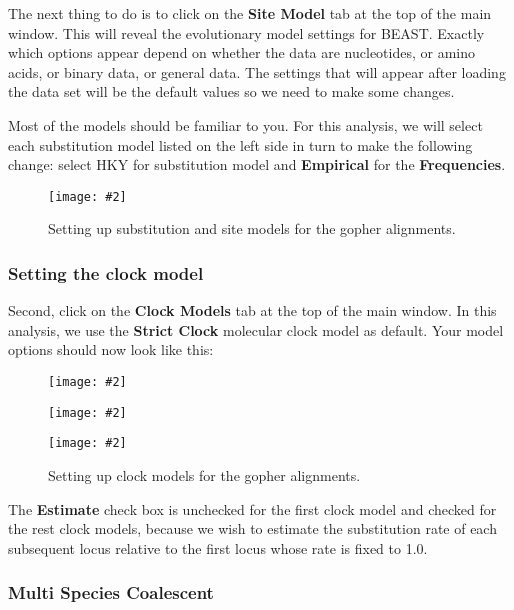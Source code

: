 \documentclass{article}
\newcommand{\includeimage}[2][]{%
\texttt{[image: \#2]}
}
\begin{document}
The next thing to do is to click on the {\bf Site Model} tab at the top of the
main window. This will reveal the evolutionary model settings for
BEAST. Exactly which options appear depend on whether the data are
nucleotides, or amino acids, or binary data, or general data.
The settings that will appear after loading the data set will
be the default values so we need to make some changes. 

Most of the models should be familiar to you. For this analysis, we
will select each substitution model listed on the 
left side in turn to make the following change: select HKY for substitution model
and \textbf{Empirical} for the \textbf{Frequencies}. 
\begin{figure}
\centering
\includeimage[width=\textwidth]{figures/BEAUti_Site_Model}

\caption{\label{fig.sitemodel} Setting up substitution and site models for the gopher alignments.}
\end{figure}


\subsubsection*{Setting the clock model}

Second, click on the {\bf Clock Models} tab at the top of the
main window. In this analysis, we use the \textbf{Strict Clock} molecular clock model as default.
Your model options should now look like this: 

\begin{figure}
\centering
\includeimage[scale=0.3,clip=true,trim=0 450 0 0]{figures/BEAUti_ClockModel1}

\centering
\includeimage[scale=0.3,clip=true,trim=0 450 0 0]{figures/BEAUti_ClockModel2}

\centering
\includeimage[scale=0.3,clip=true,trim=0 450 0 0]{figures/BEAUti_ClockModel3}

\caption{\label{fig.clockmodel} Setting up clock models for the gopher alignments.}
\end{figure}


The \textbf{Estimate} check box is unchecked for the first clock model and checked for the rest clock models, because we wish to estimate the substitution rate of each subsequent locus relative to the first locus whose rate is fixed to 1.0. 

\subsubsection*{Multi Species Coalescent}
\end{document}
